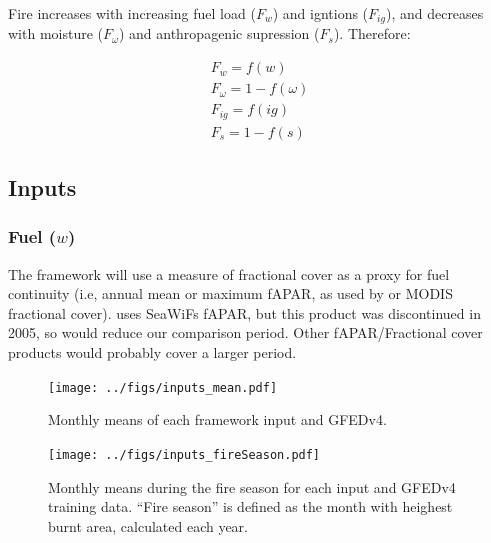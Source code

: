 Fire increases with increasing fuel load ($F_w$) and igntions ($F_{ig}$), and decreases with moisture ($F_{\omega}$) and anthropagenic supression ($F_s$). Therefore:

\begin{equation}
    \begin{split}
        F_{w} = f(w) \\
        F_{\omega} = 1 - f(\omega) \\
        F_{ig} = f(ig) \\
        F_{s} = 1- f(s)
    \end{split}
    \label{equ:LimFIRE.x}
\end{equation}




\subsection{Inputs}

\begin{shaded}
\subsubsection{Fuel ($w$)}
The framework will use a measure of fractional cover as a proxy for fuel continuity (i.e, annual mean or maximum fAPAR, as used by \citet{knorr2014impact,knorr2016climate} or MODIS fractional cover). \citet{bistinas2014causal} uses SeaWiFs fAPAR, but this product was discontinued in 2005, so would reduce our comparison period. Other fAPAR/Fractional cover products would probably cover a larger period.
\end{shaded}

\begin{figure}[!ht]
  \centering
    \texttt{[image: ../figs/inputs\_mean.pdf]}
  \caption{Monthly means of each framework input  and GFEDv4.}
  \label{fig:Monthly_mean_ins}
\end{figure}

\begin{figure}[!ht]
  \centering
    \texttt{[image: ../figs/inputs\_fireSeason.pdf]}
  \caption{Monthly means during the fire season for each input  and GFEDv4 training data. ``Fire season'' is defined as the month with heighest burnt area, calculated each year.}
  \label{fig:Season_mean_ins}
\end{figure}

